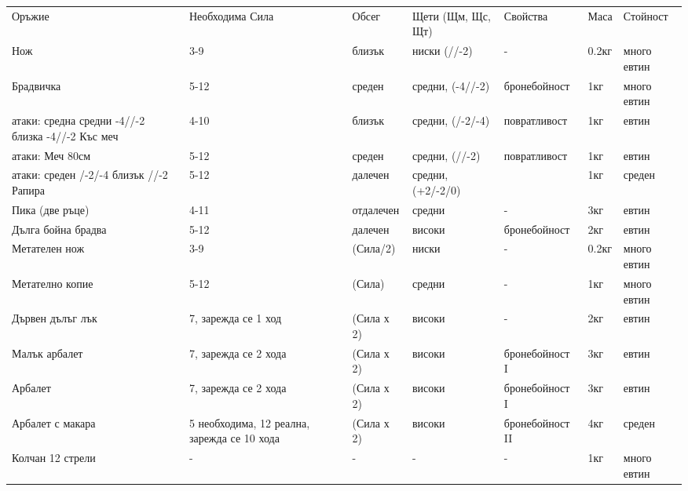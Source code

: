 \begin{tabular}{p{2cm} | p{2cm} | p{2cm} | p{2cm} | p{2cm} | p{2cm} | p{2cm}}
Оръжие                & Необходима Сила      & Обсег      & Щети (Щм, Щс, Щт)       & Свойства       & Маса  & Стойност  \\
Нож                   & 3-9                  & близък     & ниски (//-2)      & -              & 0.2кг & много евтин  \\
Брадвичка             & 5-12                 & среден     & средни, (-4//-2)  & бронебойност   & 1кг   & много евтин  \\
атаки: средна средни -4//-2 близка -4//-2
Къс меч               & 4-10                 & близък     & средни, (/-2/-4)  & повратливост   & 1кг   & евтин        \\
атаки: 
Меч 80см              & 5-12                 & среден     & средни, (//-2)    & повратливост   & 1кг   & евтин        \\
атаки: среден /-2/-4 близък //-2
Рапира                & 5-12                 & далечен    & средни, (+2/-2/0) &                & 1кг   & среден       \\

Пика (две ръце)       & 4-11                 & отдалечен  & средни     & -              & 3кг   & евтин        \\
Дълга бойна брадва    & 5-12                 & далечен    & високи     & бронебойност   & 2кг   & евтин        \\

Метателен нож         & 3-9                  & (Сила/2)   & ниски      & -              & 0.2кг & много евтин  \\
Метателно копие       & 5-12                 & (Сила)     & средни     & -              & 1кг   & много евтин  \\
Дървен дълъг лък      & 7, зарежда се 1 ход  & (Сила х 2) & високи     & -              & 2кг   & евтин        \\
Малък арбалет         & 7, зарежда се 2 хода & (Сила х 2) & високи     & бронебойност I & 3кг   & евтин        \\
Арбалет               & 7, зарежда се 2 хода & (Сила х 2) & високи     & бронебойност I & 3кг   & евтин        \\
Арбалет с макара      & 5 необходима, 12 реална, зарежда се 10 хода & (Сила х 2) & високи & бронебойност II & 4кг & среден\\
Колчан 12 стрели      & -                    & -          & -          & -              & 1кг   & много евтин  \\


\end{tabular}
